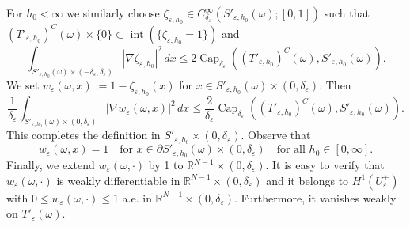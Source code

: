 \documentclass{article}
\numberwithin{equation}{section}
\theoremstyle{definition}
\theoremstyle{remark}
\newcommand{\cpct}{\operatorname{Cap}}
\newcommand{\topint}{\operatorname{int}}
\begin{document}
For $h_0 < \infty$ we similarly choose $\zeta_{\varepsilon, h_0} \in C_{\delta_\varepsilon}^\infty(S'_{\varepsilon, h_0}(\omega); [0, 1])$ such that $(T'_{\varepsilon, h_0})^C(\omega) \times \{0\} \subset \topint(\{\zeta_{\varepsilon, h_0} = 1\})$ and
\[
\int_{S'_{\varepsilon, h_0}(\omega) \times (-\delta_\varepsilon, \delta_\varepsilon)} |\nabla \zeta_{\varepsilon, h_0}|^2 \, dx \le 2 \cpct_{\delta_\varepsilon}\left((T'_{\varepsilon, h_0})^C(\omega), S'_{\varepsilon, h_0}(\omega)\right).
\]
We set $w_\varepsilon(\omega, x) := 1 - \zeta_{\varepsilon, h_0}(x)$ for $x \in S'_{\varepsilon, h_0}(\omega) \times (0, \delta_\varepsilon)$. Then
\begin{equation} \label{eq:vanishing_gradient_2}
    \frac{1}{\delta_\varepsilon} \int_{S'_{\varepsilon, h_0}(\omega) \times (0, \delta_\varepsilon)} |\nabla w_\varepsilon(\omega, x)|^2 \, dx \le \frac{2}{\delta_\varepsilon} \cpct_{\delta_\varepsilon}\left((T'_{\varepsilon, h_0})^C(\omega), S'_{\varepsilon, h_0}(\omega)\right).
\end{equation}
This completes the definition in $S'_{\varepsilon, h_0} \times (0, \delta_\varepsilon)$. Observe that 
\begin{equation} \label{eq:lateral_boundary_values_2}
    w_\varepsilon(\omega, x) = 1 \quad \text{for } x \in \partial S'_{\varepsilon, h_0}(\omega) \times (0, \delta_\varepsilon) \quad \text{for all } h_0 \in [0, \infty].
\end{equation}
Finally, we extend $w_\varepsilon(\omega, \cdot)$ by 1 to $\mathbb{R}^{N - 1} \times (0, \delta_\varepsilon)$. It is easy to verify that $w_\varepsilon(\omega, \cdot)$ is weakly differentiable in $\mathbb{R}^{N - 1} \times (0, \delta_\varepsilon)$ and it belongs to $H^1(U_\varepsilon^+)$ with $0 \le w_\varepsilon(\omega, \cdot) \le 1$ a.e. in $\mathbb{R}^{N - 1} \times (0, \delta_\varepsilon)$. Furthermore, it vanishes weakly on $T'_\varepsilon(\omega)$.
\end{document}
